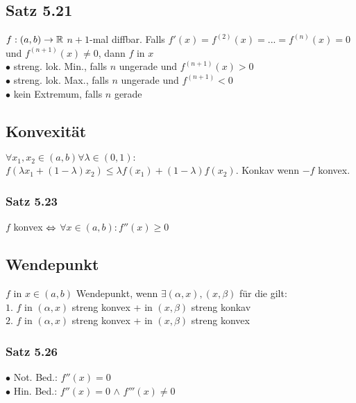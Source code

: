 \subsection*{Satz 5.21}
$f:(a, b) \rightarrow \mathbb R$ 
$n +1$-mal diffbar. Falls $f'(x) = f^{(2)}(x) = ... = f^{(n)}(x) = 0$ und $f^{(n+1)}(x) \neq 0$, dann $f$ in $x$\\
    $\bullet$ streng. lok. Min., falls $n$ ungerade und $f^{(n+1)}(x) > 0$\\
    $\bullet$ streng. lok. Max., falls $n$ ungerade und $f^{(n+1)}< 0$\\
    $\bullet$ kein Extremum, falls $n$ gerade
\subsection*{Konvexität}
$\forall x_1, x_2 \in (a,b)\forall \lambda\in(0,1):$ $f(\lambda x_1 + (1 - \lambda) x_2) \leq \lambda f(x_1) + (1 - \lambda)f(x_2)$. Konkav wenn $-f$ konvex.
\subsubsection*{Satz 5.23}
$f$ konvex $\Leftrightarrow$ $\forall x \in (a, b): f''(x) \geq 0$
\subsection*{Wendepunkt}
$f$ in $x \in (a, b)$ Wendepunkt, wenn $\exists(\alpha, x), (x, \beta)$ für die gilt:\\
    $1.$ $f$ in $(\alpha, x)$ streng konvex + in $(x, \beta)$ streng konkav\\
    $2.$ $f$ in $(\alpha, x)$ streng konvex + in $(x, \beta)$ streng konvex
\subsubsection*{Satz 5.26}
    $\bullet$ Not. Bed.: $f''(x) = 0$\\
    $\bullet$ Hin. Bed.: $f''(x) = 0$ $\land$ $f'''(x) \neq 0$
